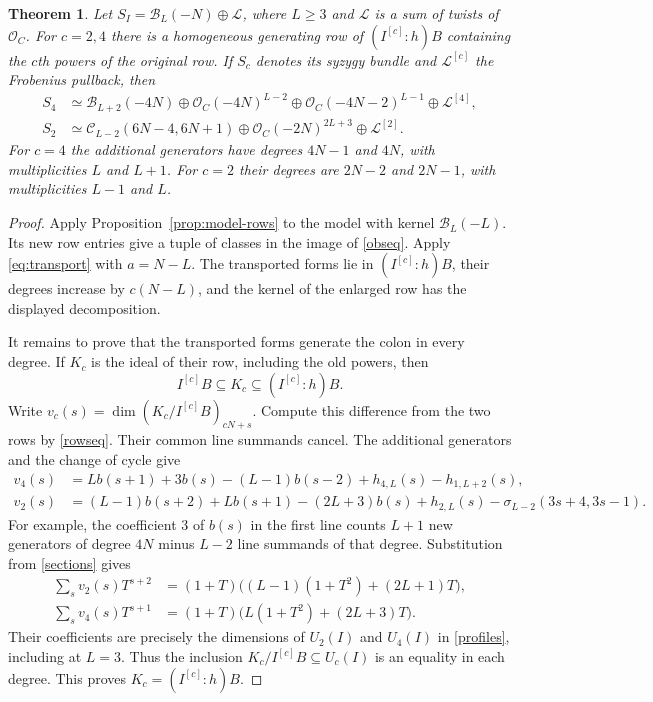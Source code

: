 \documentclass[11pt,a4paper,reqno]{amsart}
\numberwithin{equation}{section}
\theoremstyle{plain}
\newtheorem{theorem}{Theorem}[section]
\newcommand{\OO}{\mathcal O}
\newcommand{\Bcal}{\mathcal B}
\newcommand{\Ccal}{\mathcal C}
\begin{document}
\begin{theorem}\label{transitions}
Let $S_I=\Bcal_L(-N)\oplus\mathcal L$, where $L\ge3$ and $\mathcal L$ is a sum of twists of $\OO_C$. For $c=2,4$ there is a homogeneous generating row of $(I^{[c]}:h)B$ containing the $c$th powers of the original row. If $S_c$ denotes its syzygy bundle and $\mathcal L^{[c]}$ the Frobenius pullback, then
\begin{align*}
 S_4&\simeq \Bcal_{L+2}(-4N)\oplus\OO_C(-4N)^{L-2}
               \oplus\OO_C(-4N-2)^{L-1}\oplus\mathcal L^{[4]},\\
 S_2&\simeq \Ccal_{L-2}(6N-4,6N+1)\oplus\OO_C(-2N)^{2L+3}\oplus\mathcal L^{[2]}.
\end{align*}
For $c=4$ the additional generators have degrees $4N-1$ and $4N$, with multiplicities $L$ and $L+1$. For $c=2$ their degrees are $2N-2$ and $2N-1$, with multiplicities $L-1$ and $L$.
\end{theorem}

\begin{proof}
Apply Proposition~\ref{prop:model-rows} to the model with kernel $\Bcal_L(-L)$. Its new row entries give a tuple of classes in the image of \eqref{obseq}. Apply \eqref{eq:transport} with $a=N-L$. The transported forms lie in $(I^{[c]}:h)B$, their degrees increase by $c(N-L)$, and the kernel of the enlarged row has the displayed decomposition.

It remains to prove that the transported forms generate the colon in every degree. If $K_c$ is the ideal of their row, including the old powers, then
\[
 I^{[c]}B\subseteq K_c\subseteq(I^{[c]}:h)B .
\]
Write $v_c(s)=\dim (K_c/I^{[c]}B)_{cN+s}$. Compute this difference from the two rows by \eqref{rowseq}. Their common line summands cancel. The additional generators and the change of cycle give
\begin{align*}
 v_4(s)&=L b(s+1)+3b(s)-(L-1)b(s-2)
           +h_{4,L}(s)-h_{1,L+2}(s),\\
 v_2(s)&=(L-1)b(s+2)+L b(s+1)-(2L+3)b(s)
           +h_{2,L}(s)-\sigma_{L-2}(3s+4,3s-1).
\end{align*}
For example, the coefficient $3$ of $b(s)$ in the first line counts $L+1$ new generators of degree $4N$ minus $L-2$ line summands of that degree. Substitution from \eqref{sections} gives
\begin{align*}
 \sum_s v_2(s)T^{s+2}&=(1+T)\bigl((L-1)(1+T^2)+(2L+1)T\bigr),\\
 \sum_s v_4(s)T^{s+1}&=(1+T)\bigl(L(1+T^2)+(2L+3)T\bigr).
\end{align*}
Their coefficients are precisely the dimensions of $U_2(I)$ and $U_4(I)$ in \eqref{profiles}, including at $L=3$. Thus the inclusion $K_c/I^{[c]}B\subseteq U_c(I)$ is an equality in each degree. This proves $K_c=(I^{[c]}:h)B$.
\end{proof}
\end{document}

